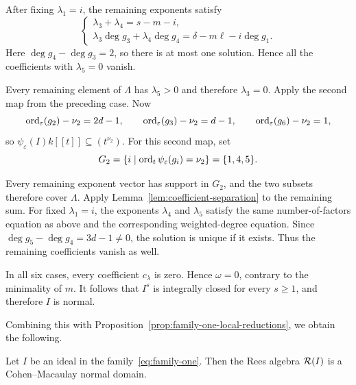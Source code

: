 After fixing $\lambda_1=i$, the remaining exponents satisfy
$$
\begin{cases}
 \lambda_3+\lambda_4=s-m-i,\\
 \lambda_3\deg g_3+\lambda_4\deg g_4
 =\delta-m\ell-i\deg g_1.
\end{cases}
$$
Here $\deg g_4-\deg g_3=2$, so there is at most one solution.  Hence all the
coefficients with $\lambda_5=0$ vanish.

Every remaining element of $\Lambda$ has $\lambda_5>0$ and therefore
$\lambda_3=0$. Apply the second map from the preceding case. Now
\[
 \operatorname{ord}_\varepsilon(g_2)-\nu_2=2d-1,\qquad
 \operatorname{ord}_\varepsilon(g_3)-\nu_2=d-1,\qquad
 \operatorname{ord}_\varepsilon(g_6)-\nu_2=1,
\]
so $\psi_\varepsilon(I)k[[t]]\subseteq(t^{\nu_2})$. For this second map, set
\[
 G_2=\{i\mid\operatorname{ord}_t\psi_\varepsilon(g_i)=\nu_2\}=\{1,4,5\}.
\]

Every remaining exponent vector has support in $G_2$, and the two
subsets therefore cover $\Lambda$. Apply Lemma~\ref{lem:coefficient-separation}
to the remaining sum. For fixed $\lambda_1=i$, the exponents
$\lambda_4$ and $\lambda_5$ satisfy the same
number-of-factors equation as above and the corresponding weighted-degree
equation.  Since $\deg g_5-\deg g_4=3d-1\neq0$, the solution is unique if it
exists.  Thus the remaining coefficients vanish as well.

In all six cases, every coefficient $c_\lambda$ is zero.  Hence $\omega=0$,
contrary to the minimality of $m$.  It follows that $I^s$ is integrally
closed for every $s\geq1$, and therefore $I$ is normal.

Combining this with Proposition~\ref{prop:family-one-local-reductions}, we obtain the following.

\begin{theorem}
\label{thm:family-one}
Let $I$ be an ideal in the family~\eqref{eq:family-one}.  Then the Rees algebra $\mathcal R(I)$ is a Cohen--Macaulay normal domain.
\end{theorem}

